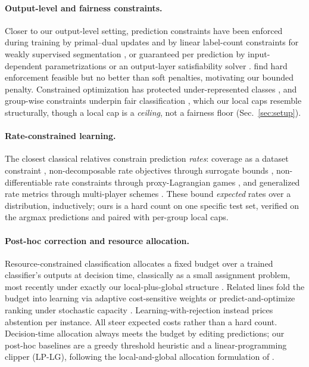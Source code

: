 \documentclass[10pt]{article}
\begin{document}
\paragraph{Output-level and fairness constraints.}
Closer to our output-level setting, prediction constraints have been enforced
during training by primal--dual updates \citep{nandwani2019primal} and by
linear label-count constraints for weakly supervised segmentation
\citep{pathak2015constrained}, or guaranteed per prediction by
input-dependent parametrizations \citep{brosowsky2021sample} or an
output-layer satisfiability solver \citep{goyal2024deepsade}.
\citet{marquez2017imposing} find hard enforcement feasible but no better than
soft penalties, motivating our bounded penalty. Constrained optimization has
protected under-represented classes \citep{sangalli2021constrained}, and
group-wise constraints underpin fair classification
\citep{bilal2015fairness,agarwal2018reductions,kearns2018preventing,donini2018empirical},
which our local caps resemble structurally, though a local cap is a
\emph{ceiling}, not a fairness floor (Sec.~\ref{sec:setup}).

\paragraph{Rate-constrained learning.}
The closest classical relatives constrain prediction \emph{rates}:
coverage as a dataset constraint \citep{goh2016satisfying}, non-decomposable
rate objectives through surrogate bounds \citep{eban2017scalable},
non-differentiable rate constraints through proxy-Lagrangian games
\citep{cotter2019optimization}, and generalized rate metrics through
multi-player schemes \citep{narasimhan2019optimizing}. These bound
\emph{expected} rates over a distribution, inductively; ours is a hard count
on one specific test set, verified on the argmax predictions and paired with
per-group local caps.

\paragraph{Post-hoc correction and resource allocation.}
Resource-constrained classification allocates a fixed budget over a trained
classifier's outputs at decision time, classically as a small assignment
problem, most recently under exactly our local-plus-global structure
\citep{shifman2025classification}. Related lines fold the budget into learning via adaptive cost-sensitive
weights \citep{shifman2023adaptive} or predict-and-optimize ranking
under stochastic capacity \citep{vanderschueren2024new}.
Learning-with-rejection \citep{cortes2016learning} instead prices
abstention per instance. All steer expected costs rather than a hard
count. Decision-time allocation always
meets the budget by editing predictions; our post-hoc baselines are a greedy
threshold heuristic and a linear-programming clipper (LP-LG), following
the local-and-global allocation formulation of
\citet{shifman2025classification}.
\end{document}

